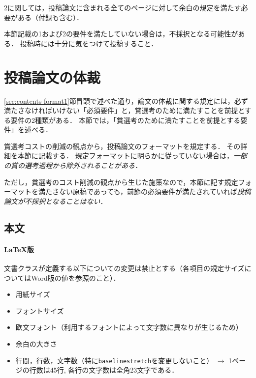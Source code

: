\documentclass[
  platex, dvipdfmx,  %
]{nlp2025}
\newcommand{\code}[1]{\texttt{#1}}
\begin{document}
2に関しては，投稿論文に含まれる全てのページに対して余白の規定を満たす必要がある（付録も含む）．

本節記載の1および2の要件を満たしていない場合は，不採択となる可能性がある．
投稿時には十分に気をつけて投稿すること．



\section{投稿論文の体裁}
\label{sec:contents-format2}
\ref{sec:contents-format1}節冒頭で述べた通り，論文の体裁に関する規定には，必ず満たさなければいけない「必須要件」と，賞選考のために満たすことを前提とする要件の2種類がある．
本節では，「賞選考のために満たすことを前提とする要件」を述べる．

賞選考コストの削減の観点から，投稿論文のフォーマットを規定する．
その詳細を本節に記載する．
規定フォーマットに明らかに従っていない場合は，\emph{一部の賞の選考過程から除外されることがある．}

ただし，賞選考のコスト削減の観点から生じた施策なので，本節に記す規定フォーマットを満たさない原稿であっても，前節の必須要件が満たされていれば\emph{投稿論文が不採択となることはない}．



\subsection{本文}

\paragraph{LaTeX版}
文書クラスが定義する以下についての変更は禁止とする（各項目の規定サイズについてはWord版の値を参照のこと）．
\begin{itemize}
\item 用紙サイズ
\item フォントサイズ
\item 欧文フォント（利用するフォントによって文字数に異なりが生じるため）
\item 余白の大きさ
\item 行間，行数，文字数（特に\code{baselinestretch}を変更しないこと） $\rightarrow$ 1ページの行数は45行, 各行の文字数は全角23文字である．
\end{itemize}
\end{document}
